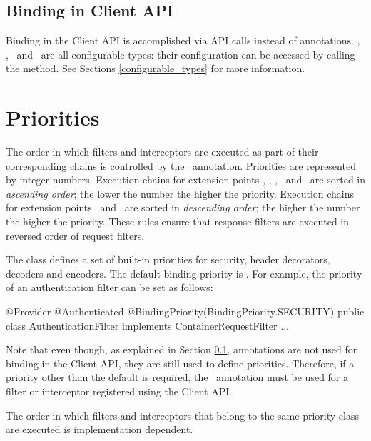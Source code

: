 \subsection{Binding in Client API}
\label{binding_in_client_api}

Binding in the Client API is accomplished via API calls instead of annotations. \Client, \Invocation, \InvocationBuilder\ and \WebTarget\ are all configurable types: their configuration can be accessed by calling the  method. See Sections \ref{configurable_types} for more information.

\section{Priorities}
\label{priorities}

The order in which filters and interceptors are executed as part of their corresponding chains is controlled by the \BindingPriority\ annotation.
Priorities are represented by integer numbers. Execution chains for extension points \ContainerRequest, \PreMatchContainerRequest, \ClientRequest, \ReadFrom\ and \WriteTo\ are sorted in \emph{ascending order}; the lower the number the higher the priority. Execution chains for extension points \ContainerResponse\ and \ClientResponse\ are sorted in \emph{descending order}; the higher the number the higher the priority. These rules ensure that response filters are executed in reversed order of request filters.

The  class defines a set of built-in priorities for security, header decorators, decoders and encoders. The default binding priority is . For example, the priority of an authentication filter can be set as follows:

\begin{listing}{1}
@Provider
@Authenticated
@BindingPriority(BindingPriority.SECURITY)
public class AuthenticationFilter implements ContainerRequestFilter {
    ...
}
\end{listing}

Note that even though, as explained in Section \ref{binding_in_client_api}, annotations are not used for binding in the Client API, they are still used to define priorities. Therefore, if a priority other than the default is required, the \BindingPriority\ annotation must be used for a filter or interceptor registered using the Client API. 

The order in which filters and interceptors that belong to the same priority class are executed is implementation dependent.


